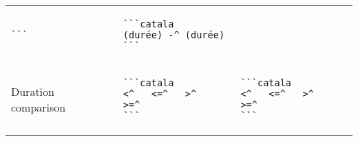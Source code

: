 \documentclass[a3paper,landscape]{article}
\begin{document}
\begin{multicols*}{2}
\begin{center}
\begin{tabular}{p{}p{}p{}}
\begin{verbatim}
```
\end{verbatim}
\vspace*{-1.75em}
&
\vspace*{-1.75em}
\begin{verbatim}
```catala
(durée) -^ (durée)
```
\end{verbatim}
\vspace*{-1.75em}
\\
Duration comparison&
\vspace*{-1.75em}
\begin{verbatim}
```catala
<^   <=^   >^   >=^
```
\end{verbatim}
\vspace*{-1.75em}
&
\vspace*{-1.75em}
\begin{verbatim}
```catala
<^   <=^   >^   >=^
```
\end{verbatim}
\vspace*{-1.75em}
\\
\bottomrule
\end{tabular}
\end{center}



\end{multicols*}
\end{document}

